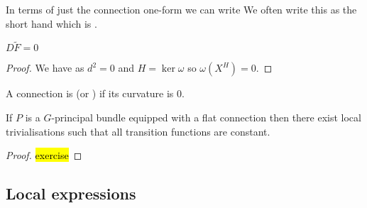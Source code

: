 \documentclass{article}
\begin{document}
\begin{prop}
	In terms of just the connection one-form we can write 
We often write this as the short hand 
which is . 
\end{prop}

\begin{theorem}
	$D \tilde{F} = 0$
\end{theorem}
\begin{proof}
	We have
as $d^2 = 0$ and $H=\ker \omega$ so $\omega(X^H)=0$. 
\end{proof}

\begin{definition}
	A connection is  (or ) if its curvature is 0. 
\end{definition}

\begin{theorem}
	If $P$ is a $G$-principal bundle equipped with a flat connection then there exist local trivialisations such that all transition functions are constant. 
\end{theorem}
\begin{proof}
	\hl{exercise}
\end{proof}
\subsection{Local expressions}
\end{document}
